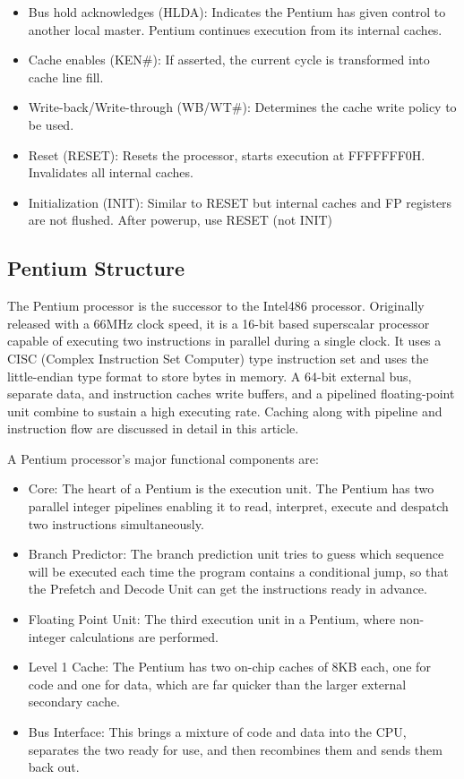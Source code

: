 \documentclass[doc,natbib,12pt]{apa6}
\begin{document}
\begin{itemize}
		\item Bus hold acknowledges (HLDA): Indicates the Pentium has given control to another local master. Pentium continues execution from its internal caches.
		\item Cache enables (KEN\#): If asserted, the current cycle is transformed into cache line fill.
		\item Write-back/Write-through (WB/WT\#): Determines the cache write policy to be used.
		\item Reset (RESET): Resets the processor, starts execution at FFFFFFF0H. Invalidates all internal caches.
		\item Initialization (INIT): Similar to RESET but internal caches and FP registers are not flushed. After powerup, use RESET (not INIT)
	\end{itemize}
	
	\subsection{Pentium Structure}
	The Pentium processor is the successor to the Intel486 processor. Originally released with a 66MHz clock speed, it is a 16-bit based superscalar processor capable of executing two instructions in parallel during a single clock. It uses a CISC (Complex Instruction Set Computer) type instruction set and uses the little-endian type format to store bytes in memory. A 64-bit external bus, separate data, and instruction caches write buffers, and a pipelined floating-point unit combine to sustain a high executing rate. Caching along with pipeline and instruction flow are discussed in detail in this article. 
	
	A Pentium processor’s major functional components are: \citep{pctechguide}
	\begin{itemize}
		\item Core: The heart of a Pentium is the execution unit. The Pentium has two parallel integer pipelines enabling it to read, interpret, execute and despatch two instructions simultaneously.
		\item Branch Predictor: The branch prediction unit tries to guess which sequence will be executed each time the program contains a conditional jump, so that the Prefetch and Decode Unit can get the instructions ready in advance.
		\item Floating Point Unit: The third execution unit in a Pentium, where non-integer calculations are performed.
		\item Level 1 Cache: The Pentium has two on-chip caches of 8KB each, one for code and one for data, which are far quicker than the larger external secondary cache.
		\item Bus Interface: This brings a mixture of code and data into the CPU, separates the two ready for use, and then recombines them and sends them back out.
	\end{itemize}
	
\end{document}

